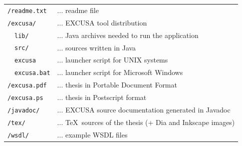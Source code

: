 \documentclass[12pt,notitlepage]{report}
\begin{document}
\begin{center}
\renewcommand{\arraystretch}{1.3}
\begin{tabular}{lll}
\multicolumn{2}{l}{\texttt{/readme.txt}} & ... readme file\\
\multicolumn{2}{l}{\texttt{/excusa/}} & ... EXCUSA tool distribution \\
& \texttt{lib/} & ... Java archives needed to run the application\\
& \texttt{src/} & ... sources written in Java\\
& \texttt{excusa} & ... launcher script for UNIX systems\\
& \texttt{excusa.bat} &  ... launcher script for Microsoft Windows\\
\multicolumn{2}{l}{\texttt{/excusa.pdf}} & ... thesis in Portable Document Format\\
\multicolumn{2}{l}{\texttt{/excusa.ps}} & ... thesis in Postscript format\\
\multicolumn{2}{l}{\texttt{/javadoc/}} & ... EXCUSA source documentation generated in Javadoc\\
\multicolumn{2}{l}{\texttt{/tex/}} & ... \TeX~sources of the thesis (+ Dia and Inkscape images) \\
\multicolumn{2}{l}{\texttt{/wsdl/}} & ... example WSDL files
\end{tabular}
\end{center}
\end{document}
